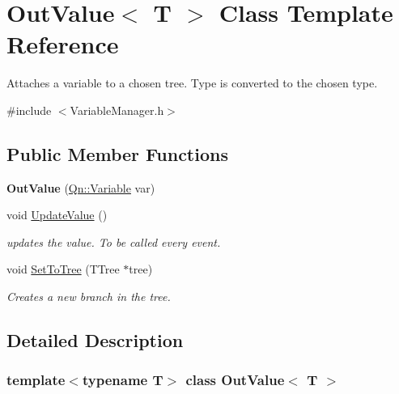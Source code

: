 \hypertarget{classOutValue}{}\section{Out\+Value$<$ T $>$ Class Template Reference}
\label{classOutValue}


Attaches a variable to a chosen tree. Type is converted to the chosen type.  




{\ttfamily \#include $<$Variable\+Manager.\+h$>$}

\subsection*{Public Member Functions}
\begin{DoxyCompactItemize}
\item 
\mbox{\label{classOutValue_a800a48d36f71a786ca7a63a1391efd1b}} 
{\bfseries Out\+Value} (\mbox{\hyperlink{classQn_1_1Variable}{Qn\+::\+Variable}} var)
\item 
\mbox{\label{classOutValue_a86be432e41b39939e9bc31719a6180a8}} 
void \mbox{\hyperlink{classOutValue_a86be432e41b39939e9bc31719a6180a8}{Update\+Value}} ()
\begin{DoxyCompactList}\small\item\em updates the value. To be called every event. \end{DoxyCompactList}\item 
void \mbox{\hyperlink{classOutValue_a33ee7e5f1148debbdaa83abfa1c78379}{Set\+To\+Tree}} (T\+Tree $\ast$tree)
\begin{DoxyCompactList}\small\item\em Creates a new branch in the tree. \end{DoxyCompactList}\end{DoxyCompactItemize}


\subsection{Detailed Description}
\subsubsection*{template$<$typename T$>$\newline
class Out\+Value$<$ T $>$}


